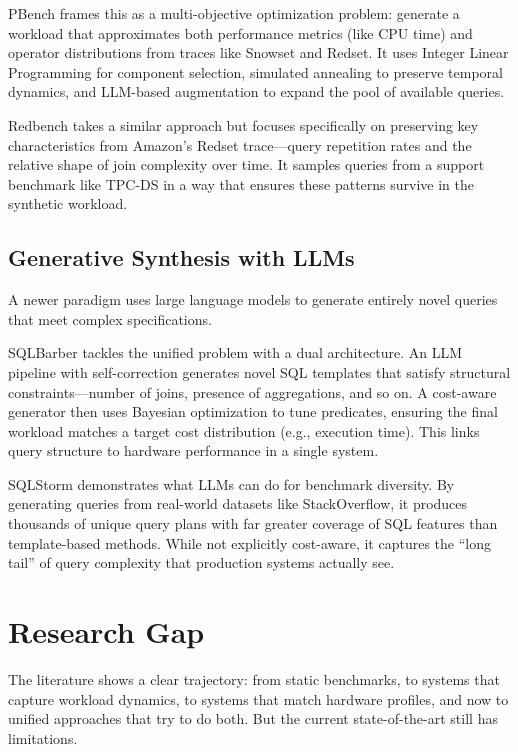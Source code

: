 \documentclass[12pt]{report}
\begin{document}
PBench \cite{pbench} frames this as a multi-objective optimization problem: generate a workload that approximates both performance metrics (like CPU time) and operator distributions from traces like Snowset and Redset. It uses Integer Linear Programming for component selection, simulated annealing to preserve temporal dynamics, and LLM-based augmentation to expand the pool of available queries.

Redbench \cite{redbench} takes a similar approach but focuses specifically on preserving key characteristics from Amazon's Redset trace---query repetition rates and the relative shape of join complexity over time. It samples queries from a support benchmark like TPC-DS in a way that ensures these patterns survive in the synthetic workload.

\subsection{Generative Synthesis with LLMs}
\label{subsec:llm-synthesis}

A newer paradigm uses large language models to generate entirely novel queries that meet complex specifications.

SQLBarber \cite{sqlbarber} tackles the unified problem with a dual architecture. An LLM pipeline with self-correction generates novel SQL templates that satisfy structural constraints---number of joins, presence of aggregations, and so on. A cost-aware generator then uses Bayesian optimization to tune predicates, ensuring the final workload matches a target cost distribution (e.g., execution time). This links query structure to hardware performance in a single system.

SQLStorm \cite{sqlstorm} demonstrates what LLMs can do for benchmark diversity. By generating queries from real-world datasets like StackOverflow, it produces thousands of unique query plans with far greater coverage of SQL features than template-based methods. While not explicitly cost-aware, it captures the ``long tail'' of query complexity that production systems actually see.

\section{Research Gap}
\label{sec:gap}

The literature shows a clear trajectory: from static benchmarks, to systems that capture workload dynamics, to systems that match hardware profiles, and now to unified approaches that try to do both. But the current state-of-the-art still has limitations.
\end{document}

